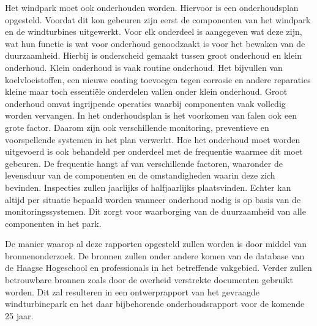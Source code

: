 Het windpark moet ook onderhouden worden. Hiervoor is een onderhoudsplan opgesteld. Voordat dit kon gebeuren zijn eerst de componenten van het windpark en de windturbines uitgewerkt. Voor elk onderdeel is aangegeven wat deze zijn, wat hun functie is wat voor onderhoud genoodzaakt is voor het bewaken van de duurzaamheid. Hierbij is onderscheid gemaakt tussen groot onderhoud en klein onderhoud. Klein onderhoud is vaak routine onderhoud. Het bijvullen van koelvloeistoffen, een nieuwe coating toevoegen tegen corrosie en andere reparaties kleine maar toch essentiële onderdelen vallen onder klein onderhoud. Groot onderhoud omvat ingrijpende operaties waarbij componenten vaak volledig worden vervangen. In het onderhoudsplan is het voorkomen van falen ook een grote factor. Daarom zijn ook verschillende monitoring, preventieve en voorspellende systemen in het plan verwerkt. Hoe het onderhoud moet worden uitgevoerd is ook behandeld per onderdeel met de frequentie waarmee dit moet gebeuren. De frequentie hangt af van verschillende factoren, waaronder de levensduur van de componenten en de omstandigheden waarin deze zich bevinden. Inspecties zullen jaarlijks of halfjaarlijks plaatsvinden. Echter kan altijd per situatie bepaald worden wanneer onderhoud nodig is op basis van de monitoringssystemen. Dit zorgt voor waarborging van de duurzaamheid van alle componenten in het park. 

De manier waarop al deze rapporten opgesteld zullen worden is door middel van bronnenonderzoek. De bronnen zullen onder andere komen van de database van de Haagse Hogeschool en professionals in het betreffende vakgebied. Verder zullen betrouwbare bronnen zoals door de overheid verstrekte documenten gebruikt worden. Dit zal resulteren in een ontwerprapport van het gevraagde windturbinepark en het daar bijbehorende onderhoudsrapport voor de komende 25 jaar. 

